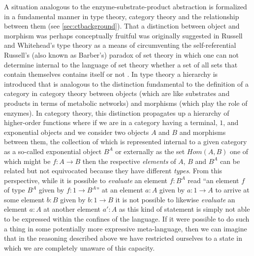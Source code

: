 \documentclass[10pt]{article}
\theoremstyle{plain}
\theoremstyle{definition}
\theoremstyle{remark}
\begin{document}
A situation analogous to the enzyme-substrate-product abstraction is formalized in a fundamental manner in type theory, category theory and the relationship between them (see \ref{sec:ctbackground}). That a distinction between object and morphism was perhaps conceptually fruitful was originally suggested in Russell and Whitehead's type theory as a means of circumventing the self-referential Russell's (also known as Barber's) paradox of set theory in which one can not determine internal to the language of set theory whether a set of all sets that contain themselves contains itself or not \cite{Bell2012}. In type theory a hierarchy is introduced that is analogous to the distinction fundamental to the definition of a category in category theory between objects (which are like substrates and products in terms of metabolic networks) and morphisms (which play the role of enzymes). In category theory, this distinction propagates up a hierarchy of higher-order functions where if we are in a category having a terminal, $1$, and exponential objects and we consider two objects $A$ and $B$ and morphisms between them, the collection of which is represented internal to a given category as a so-called exponential object $B^A$ or externally as the set $Hom(A,B)$ one of which might be $f \colon A \rightarrow B$ then the respective \emph{elements} of $A$, $B$ and $B^A$ can be related but not equivocated because they have different \emph{types}. From this perspective, while it is possible to \emph{evaluate} an element $f:B^A$ read ``an element $f$ of type $B^A$ given by $f \colon 1 \rightarrow B^A$'' at an element $a:A$ given by $a \colon 1 \rightarrow A$ to arrive at some element $b:B$ given by $b \colon 1 \rightarrow B$ it is not possible to likewise \emph{evaluate} an element $a:A$ at another element $a':A$ as this kind of statement is simply not able to be expressed within the confines of the language. If it were possible to do such a thing in some potentially more expressive meta-language, then we can imagine that in the reasoning described above we have restricted ourselves to a state in which we are completely unaware of this capacity.
\end{document}
